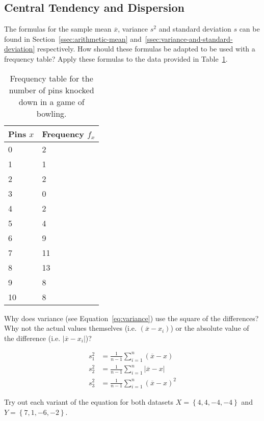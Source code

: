 \subsection{Central Tendency and Dispersion}

\begin{exercise}
  \label{ex:mean-stdev-freq}
  The formulas for the sample mean $\overline{x}$, variance $s^2$ and standard deviation $s$ can be found in Section~\ref{ssec:arithmetic-mean} and~\ref{ssec:variance-and-standard-deviation} respectively.
  How should these formulas  be adapted to be used with a frequency table? Apply these formulas to the data provided in Table~\ref{tab:pinfreq}.
\end{exercise}

\begin{table}
  \centering
  \begin{tabular}{@{}ll@{}}
    \toprule
    Pins $x$ & Frequency $f_{x}$ \\ 
    \midrule
        0      &         2          \\
        1      &         1          \\
        2      &         2          \\
        3      &         0          \\
        4      &         2          \\
        5      &         4          \\
        6      &         9          \\
        7      &         11         \\
        8      &         13         \\
        9      &         8          \\
        10     &         8          \\
    \bottomrule
  \end{tabular}
  \caption{Frequency table for the number of pins knocked down in a game of bowling.}
  \label{tab:pinfreq}
\end{table}

\begin{exercise}
  \label{ex:variance-formula}
  Why does variance (see Equation~\ref{eq:variance}) use the square of the differences? Why not the actual values themselves (i.e. $(\overline{x} - x_i)$) or the absolute value of the difference (i.e. $\left|\overline{x} - x_i\right|$)?
  
  \begin{align}
  s^{2}_{1} &= \frac{1}{n-1} \sum_{i=1}^{n} (\overline{x} - x) \\
  s^{2}_{2} &= \frac{1}{n-1} \sum_{i=1}^{n} \left| \overline{x} - x\right| \\
  s^{2}_{3} &= \frac{1}{n-1} \sum_{i=1}^{n} (\overline{x} - x)^{2}
  \end{align}
  
  Try out each variant of the equation for both datasets $X = \left\{4,4,-4,-4\right\}$ and $Y = \left\{7,1,-6,-2\right\}$.
\end{exercise}

